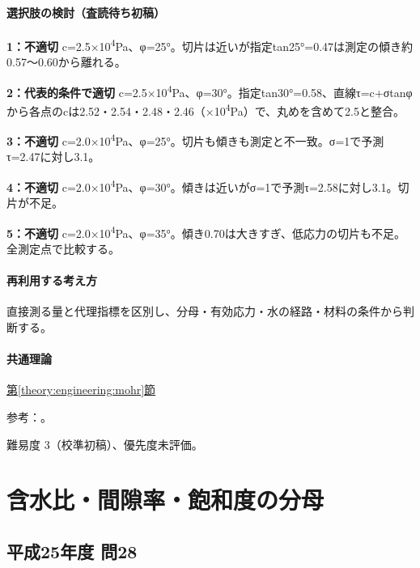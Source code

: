 \paragraph{選択肢の検討（査読待ち初稿）}\mbox{}\par

\noindent\textbf{1：不適切} c=\allowbreak{}2.5×10\textsuperscript{4}Pa、φ=25°。切片は近いが指定tan25°=0.47は測定の傾き約0.57〜0.60から離れる。\par

\noindent\textbf{2：代表的条件で適切} c=\allowbreak{}2.5×10\textsuperscript{4}Pa、φ=30°。指定tan30°=0.58、直線τ=c+σtanφから各点のcは2.52・2.54・2.48・2.46（×10\textsuperscript{4}Pa）で、丸めを含めて2.5と整合。\par

\noindent\textbf{3：不適切} c=\allowbreak{}2.0×10\textsuperscript{4}Pa、φ=25°。切片も傾きも測定と不一致。σ=1で予測τ=2.47に対し3.1。\par

\noindent\textbf{4：不適切} c=\allowbreak{}2.0×10\textsuperscript{4}Pa、φ=30°。傾きは近いがσ=1で予測τ=2.58に対し3.1。切片が不足。\par

\noindent\textbf{5：不適切} c=\allowbreak{}2.0×10\textsuperscript{4}Pa、φ=35°。傾き0.70は大きすぎ、低応力の切片も不足。全測定点で比較する。\par

\paragraph{再利用する考え方} 直接測る量と代理指標を区別し、分母・有効応力・水の経路・材料の条件から判断する。

\paragraph{共通理論} \hyperref[theory:engineering:mohr]{第\ref*{theory:engineering:mohr}節}

\par 参考：\cite{eng52_mohr_ref}。

\par 難易度 3（校準初稿）、優先度未評価。

\section{含水比・間隙率・飽和度の分母}

\subsection{平成25年度 問28}
\label{q:h25-reg-applied-28}

